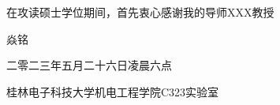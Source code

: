 %
% 
%

在攻读硕士学位期间，首先衷心感谢我的导师XXX教授

\vspace{1em}
\begin{flushright}
    焱铭

    二零二三年\enspace 五月二十六日\enspace 凌晨六点
    
    桂林电子科技大学机电工程学院C323实验室
\end{flushright}